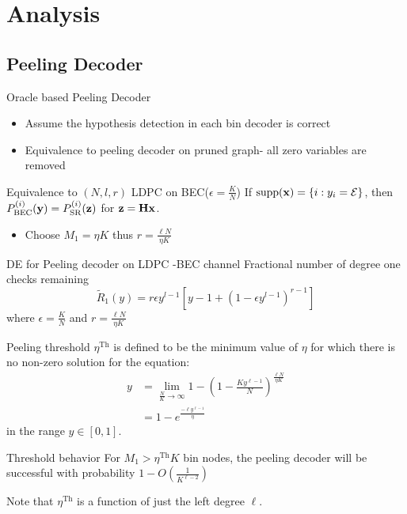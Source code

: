 \documentclass[10pt]{beamer}
\begin{document}
\section{Analysis}
\subsection{Peeling Decoder}
\begin{frame}{Oracle based Peeling Decoder}
\begin{itemize}
\item Assume the hypothesis detection in each bin decoder is correct
\item Equivalence to peeling decoder on pruned graph- all zero variables are removed
\end{itemize}
\begin{block}{Equivalence to $(N,l,r)$ LDPC on BEC($\epsilon=\frac{K}{N}$)}
If $\text{supp}(\mathbf{x})=\{i:y_i=\mathcal{E}\}$, then $P^{(i)}_{\text{BEC}}(\mathbf{y})=P^{(i)}_{\text{SR}}(\mathbf{z})$  for $\mathbf{z=Hx}$.
\end{block}
\begin{itemize}
\item Choose $M_1=\eta K$ thus $r=\frac{\ell N}{\eta K}$
\end{itemize}
\vspace{1ex}
\begin{block}{DE for Peeling decoder on LDPC -BEC channel}
Fractional number of degree one checks remaining
\begin{equation*}
\tilde{R}_1(y)=r\epsilon y^{l-1}[y-1+(1-\epsilon y^{l-1})^{r-1}]
\end{equation*}
where $\epsilon=\frac{K}{N}$ and $r=\frac{\ell N}{\eta K}$
\end{block}
\end{frame}

\begin{frame}{}
\begin{block}{Peeling threshold}
$\eta^{\text{Th}}$ is defined to be the minimum value of $\eta$ for which there is no non-zero solution for the equation:
\begin{align*}
y&=\lim_{\frac{N}{K}\rightarrow\infty}1-\left(1-\frac{Ky^{\ell-1}}{N}\right)^{\frac{\ell N}{\eta K}}\\
  &=1-e^{\frac{-\ell y^{\ell-1}}{\eta}}
\end{align*}
in the range $y\in [0,1]$.
\end{block}
\vspace{3ex}
\begin{block}{Threshold behavior}
For $M_1>\eta^{\text{Th}}K$ bin nodes, the peeling decoder will be successful with probability $1-O\left(\frac{1}{K^{\ell-2}}\right)$
\end{block}
Note that $\eta^{\text{Th}}$ is a function of just the left degree $\ell$.
\end{frame}
\end{document}
